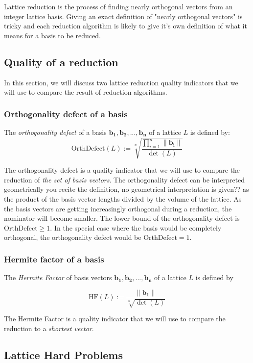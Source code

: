 \documentclass[10pt, a4paper]{article}
\newcommand{\my}[1]{{\color{blue} #1 }}
\renewcommand{\vec}[1]{\mathbf{#1}}
\begin{document}
Lattice reduction is the process of finding nearly orthogonal vectors from an integer lattice basis. Giving an exact definition of "nearly orthogonal vectors" is tricky and each reduction algorithm is likely to give it's own definition of what it means for a basis to be reduced.

\subsection{Quality of a reduction}

In this section, we will discuss two lattice reduction quality indicators that we will use to compare the result of reduction algorithms.

\subsubsection{Orthogonality defect of a basis}
\label{sec:orthogonalityDefect}
The \emph{orthogonality defect} of a basis $\vec{b_1},\vec{b_2},...,\vec{b_n}$ of a lattice $L$ is defined by:
\[
    \text{OrthDefect}(L) :=  \sqrt[n]{\frac{\displaystyle\prod^{n}_{i=1} \|\vec{b_i}\| }{\det(L)}}
\]

The orthogonality defect is a quality indicator that we will use to compare the reduction of \emph{the set of basis vectors}. The orthogonality defect can be interpreted geometrically \my{you recite the definition, no geometrical interpretation is given??} as the product of the basis vector lengths divided by the volume of the lattice. As the basis vectors are getting increasingly orthogonal during a reduction, the nominator will become smaller. The lower bound of the orthogonality defect is $\text{OrthDefect} \ge 1$. In the special case where the basis would be completely orthogonal, the orthogonality defect would be $\text{OrthDefect} = 1$.

\subsubsection{Hermite factor of a basis}
\label{sec:hermiteFactor}
The \emph{Hermite Factor} of basis vectors $\vec{b_1}, \vec{b_2},...,\vec{b_n}$ of a lattice $L$ is defined by

\[
    \text{HF}(L) := \frac{\|\vec{b_1}\|}{\sqrt[n]{\det(L)}}
\]

The Hermite Factor is a quality indicator that we will use to compare the reduction to a \emph{shortest vector}.

\subsection{Lattice Hard Problems}
\end{document}
